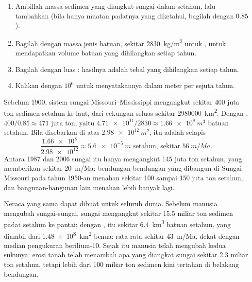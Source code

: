\begin{method}\label{met:g12:destruction-of-mountains:budget}
\begin{enumerate}
  \item Ambillah massa sedimen yang diangkut sungai dalam setahun, lalu
        tambahkan  (bila hanya muatan padatnya yang
        diketahui, bagilah dengan $0.85$).
  \item Bagilah dengan massa jenis batuan, sekitar \qty{2830}{kg/m^3} untuk
        , untuk mendapatkan volume batuan yang dihilangkan setiap
        tahun.
  \item Bagilah dengan luas : hasilnya adalah tebal yang
        dihilangkan setiap tahun.
  \item Kalikan dengan $10^6$ untuk menyatakannya dalam meter per sejuta tahun.
\end{enumerate}
\end{method}

\begin{example}\label{ex:g12:destruction-of-mountains:mississippi}
Sebelum 1900, sistem sungai Missouri--Mississippi mengangkut sekitar 400 juta
ton sedimen setahun ke laut, dari cekungan seluas sekitar
\qty{2980000}{km^2}. Dengan , $400/0.85 \approx 471$ juta
ton, yaitu $\num{4.71e11}/2830 \approx \qty{1.66e8}{m^3}$ batuan setahun.
Bila disebarkan di atas $\qty{2.98e12}{m^2}$, itu adalah selapis
\[
  \frac{\num{1.66e8}}{\num{2.98e12}} \approx \qty{5.6e-5}{m}
  \text{ setahun, sekitar } \qty{56}{m/Ma}.
\]
Antara 1987 dan 2006 sungai itu hanya mengangkut 145 juta ton setahun, yang
memberikan sekitar \qty{20}{m/Ma}: bendungan-bendungan yang dibangun di Sungai
Missouri pada tahun 1950-an menahan sekitar 100 sampai 150 juta ton setahun,
dan bangunan-bangunan lain menahan lebih banyak lagi.
\end{example}

Neraca yang sama dapat dibuat untuk seluruh dunia. Sebelum manusia mengubah
sungai-sungai, sungai mengangkut sekitar 15.5 miliar ton sedimen padat setahun
ke pantai; dengan , itu sekitar \qty{6.4}{km^3} batuan
setahun, yang diambil dari \qty{1.48e8}{km^2} benua:  rata-rata
sekitar \qty{43}{m/Ma}, dekat dengan median pengukuran berilium-10. Sejak itu
manusia telah mengubah kedua sukunya: erosi tanah telah menambah apa yang
diangkat sungai sekitar 2.3 miliar ton setahun, tetapi lebih dari 100 miliar ton
sedimen kini tertahan di belakang bendungan.

